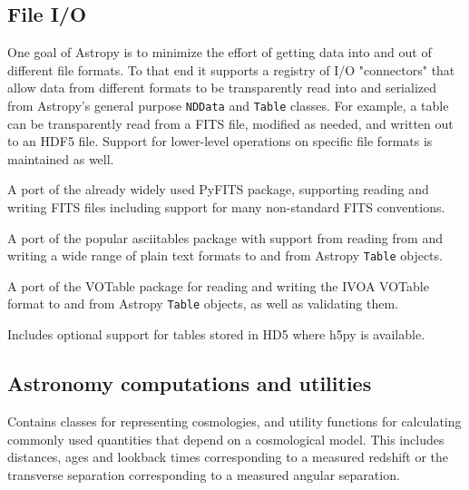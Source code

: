 \documentclass[11pt,twoside]{article}
\begin{document}
\subsection{File I/O}

One goal of Astropy is to minimize the effort of getting data into and out of
different file formats. To that end it supports a registry of I/O "connectors"
that allow data from different formats to be transparently read into and
serialized from Astropy's general purpose \texttt{NDData} and \texttt{Table}
classes.  For example, a table can be transparently read from a FITS file,
modified as needed, and written out to an HDF5 file.  Support for lower-level
operations on specific file formats is maintained as well.


A port of the already widely used PyFITS package, supporting reading and
writing FITS files including support for many non-standard FITS conventions.


A port of the popular asciitables package with support from reading from and
writing a wide range of plain text formats to and from Astropy \texttt{Table}
objects.


A port of the VOTable package for reading and writing the IVOA VOTable format
to and from Astropy \texttt{Table} objects, as well as validating them.


Includes optional support for tables stored in HD5 where h5py is available.

\subsection{Astronomy computations and utilities}


Contains classes for representing cosmologies, and utility functions for
calculating commonly used quantities that depend on a cosmological model. This
includes distances, ages and lookback times corresponding to a measured
redshift or the transverse separation corresponding to a measured angular
separation.

\end{document}

